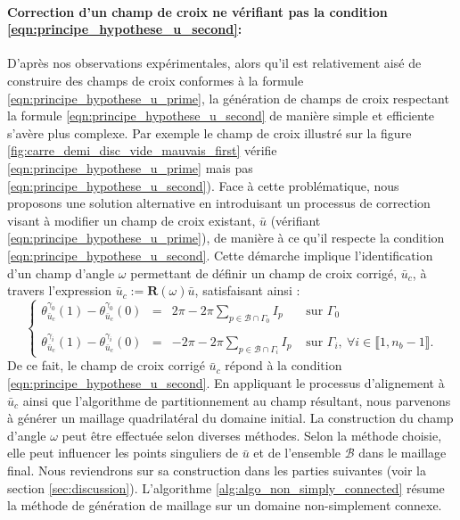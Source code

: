 \paragraph{Correction d'un champ de croix ne vérifiant pas la condition \eqref{eqn:principe_hypothese_u_second}:} D'après nos observations expérimentales, alors qu'il est relativement aisé de construire des champs de croix conformes à la formule \eqref{eqn:principe_hypothese_u_prime}, la génération de champs de croix respectant la formule \eqref{eqn:principe_hypothese_u_second} de manière simple et efficiente s'avère plus complexe. Par exemple le champ de croix illustré sur la figure \ref{fig:carre_demi_disc_vide_mauvais_first} vérifie \eqref{eqn:principe_hypothese_u_prime} mais pas \eqref{eqn:principe_hypothese_u_second}). Face à cette problématique, nous proposons une solution alternative en introduisant un processus de correction visant à modifier un champ de croix existant, $\bar{u}$ (vérifiant \ref{eqn:principe_hypothese_u_prime}), de manière à ce qu'il respecte la condition \eqref{eqn:principe_hypothese_u_second}. Cette démarche implique l'identification d'un champ d'angle $\omega$ permettant de définir un champ de croix corrigé, $\bar{u}_c$, à travers l'expression $\bar{u}_c:=\mathbf{R}(\omega)\bar{u}$, satisfaisant ainsi :
\begin{equation}
    \left\{
    \begin{array}{lcll}
    \theta_{\bar{u}_c}^{\gamma_0}(1)-\theta_{\bar{u}_c}^{\gamma_0}(0)&=&2\pi-2\pi\displaystyle\sum_{p\in\mathcal{B}\cap\Gamma_0}I_p&\mbox{ sur }\Gamma_0\\\\
    \theta_{\bar{u}_c}^{\gamma_i}(1)-\theta_{\bar{u}_c}^{\gamma_i}(0)&=&-2\pi-2\pi\displaystyle\sum_{p\in\mathcal{B}\cap\Gamma_i}I_p&\mbox{ sur }\Gamma_i,~\forall i\in\llbracket 1, n_b-1\rrbracket.
    \end{array}
    \right.
\end{equation}
De ce fait, le champ de croix corrigé $\bar{u}_c$ répond à la condition \eqref{eqn:principe_hypothese_u_second}. En appliquant le processus d'alignement à $\bar{u}_c$ ainsi que l'algorithme de partitionnement au champ résultant, nous parvenons à générer un maillage quadrilatéral du domaine initial. La construction du champ d'angle $\omega$ peut être effectuée selon diverses méthodes. Selon la méthode choisie, elle peut influencer les points singuliers de $\bar{u}$ et de l'ensemble $\mathcal{B}$ dans le maillage final. Nous reviendrons sur sa construction dans les parties suivantes (voir la section \ref{sec:discussion}).  L'algorithme \ref{alg:algo_non_simply_connected} résume la méthode de génération de maillage sur un domaine non-simplement connexe.

